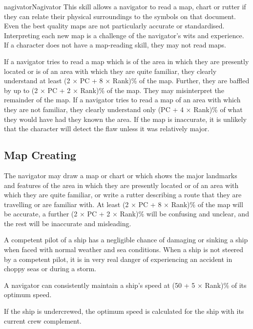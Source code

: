 \begin{Skill}[1.1]{nagivator}{Nagivator}
This skill allows a navigator to read a map, chart or rutter if they
can relate their physical surroundings to the symbols on that
document.  Even the best quality maps are not particularly accurate or
standardised. Interpreting each new map is a challenge of the
navigator’s wits and experience. If a character does not have a
map-reading skill, they may not read maps.

If a navigator tries to read a map which is of the area in which they
are presently located or is of an area with which they are quite
familiar, they clearly understand at least (2 × PC + 8 × Rank)\% of
the map.  Further, they are baffled by up to (2 × PC + 2 × Rank)\% of
the map. They may misinterpret the remainder of the map.  If a
navigator tries to read a map of an area with which they are not
familiar, they clearly understand only (PC + 4 × Rank)\% of what they
would have had they known the area.  If the map is inaccurate, it is
unlikely that the character will detect the flaw unless it was
relatively major.


\subsection{Map Creating}

The navigator may draw a map or chart or which shows the major
landmarks and features of the area in which they are presently located
or of an area with which they are quite familiar, or write a rutter
describing a route that they are travelling or are familiar with. At
least (2 × PC + 8 × Rank)\% of the map will be accurate, a further (2
× PC + 2 × Rank)\% will be confusing and unclear, and the rest will be
inaccurate and misleading.


A competent pilot of a ship has a negligible chance of damaging or
sinking a ship when faced with normal weather and sea conditions.
When a ship is not steered by a competent pilot, it is in very real
danger of experiencing an accident in choppy seas or during a storm.

A navigator can consistently maintain a ship’s speed at (50 + 5 ×
Rank)\% of its optimum speed.

If the ship is undercrewed, the optimum speed is calculated for the
ship with its current crew complement.


\end{Skill}
